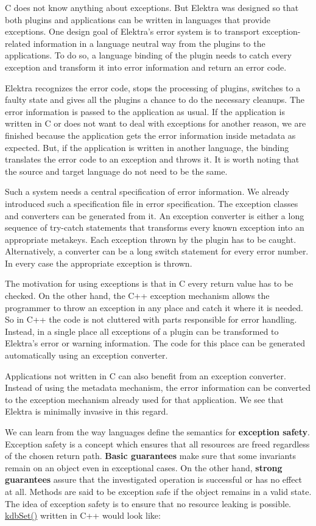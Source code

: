 C does not know anything about exceptions. But Elektra was designed so that both plugins and applications can be written in languages that provide exceptions. One design goal of Elektra’s error system is to transport exception-\/related information in a language neutral way from the plugins to the applications. To do so, a language binding of the plugin needs to catch every exception and transform it into error information and return an error code.

Elektra recognizes the error code, stops the processing of plugins, switches to a faulty state and gives all the plugins a chance to do the necessary cleanups. The error information is passed to the application as usual. If the application is written in C or does not want to deal with exceptions for another reason, we are finished because the application gets the error information inside metadata as expected. But, if the application is written in another language, the binding translates the error code to an exception and throws it. It is worth noting that the source and target language do not need to be the same.

Such a system needs a central specification of error information. We already introduced such a specification file in error specification. The exception classes and converters can be generated from it. An exception converter is either a long sequence of try-\/catch statements that transforms every known exception into an appropriate metakeys. Each exception thrown by the plugin has to be caught. Alternatively, a converter can be a long switch statement for every error number. In every case the appropriate exception is thrown.

The motivation for using exceptions is that in C every return value has to be checked. On the other hand, the C++ exception mechanism allows the programmer to throw an exception in any place and catch it where it is needed. So in C++ the code is not cluttered with parts responsible for error handling. Instead, in a single place all exceptions of a plugin can be transformed to Elektra’s error or warning information. The code for this place can be generated automatically using an exception converter.

Applications not written in C can also benefit from an exception converter. Instead of using the metadata mechanism, the error information can be converted to the exception mechanism already used for that application. We see that Elektra is minimally invasive in this regard.

We can learn from the way languages define the semantics for {\bfseries{exception safety}}. Exception safety is a concept which ensures that all resources are freed regardless of the chosen return path. {\bfseries{Basic guarantees}} make sure that some invariants remain on an object even in exceptional cases. On the other hand, {\bfseries{strong guarantees}} assure that the investigated operation is successful or has no effect at all. Methods are said to be exception safe if the object remains in a valid state. The idea of exception safety is to ensure that no resource leaking is possible. {\ttfamily \mbox{\hyperlink{group__kdb_ga11436b058408f83d303ca5e996832bcf}{kdb\+Set()}}} written in C++ would look like\+:


